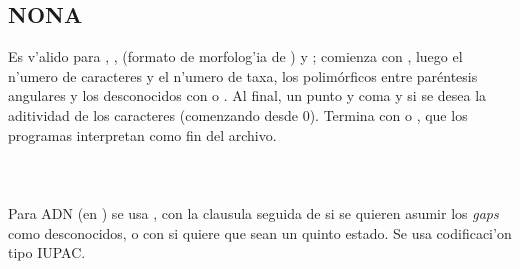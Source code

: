 \subsection{NONA}
\noindent
Es v'alido para , ,  (formato de morfolog'ia de ) y ; comienza con , luego el n'umero de caracteres y el n'umero de taxa, los polim\'orficos entre par\'entesis angulares y los desconocidos con \Cmd{-} o . Al final, un punto y coma y si se desea la aditividad de los caracteres (comenzando desde 0). Termina con  o , que los programas interpretan como fin del archivo.\\
\\
\noindent
{}\\
\\
Para ADN (en ) se usa , con la clausula  seguida de  si se quieren asumir los \textit{gaps} como desconocidos, o con \Cmd{;} si quiere que sean un quinto estado. Se usa codificaci'on tipo IUPAC.\\
\\
